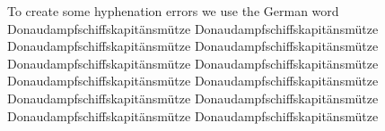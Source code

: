 \documentclass[a5paper]{article}
\begin{document}
To create some hyphenation errors we use the German word 
Donaudampfschiffskapitänsmütze Donaudampfschiffskapitänsmütze 
Donaudampfschiffskapitänsmütze Donaudampfschiffskapitänsmütze 
Donaudampfschiffskapitänsmütze Donaudampfschiffskapitänsmütze 
Donaudampfschiffskapitänsmütze Donaudampfschiffskapitänsmütze 
Donaudampfschiffskapitänsmütze Do\-nau\-dampf\-schiffs\-ka\-pi\-täns\-müt\-ze 
Donaudampfschiffskapitänsmütze Donaudampfschiffskapitänsmütze 
\end{document}

